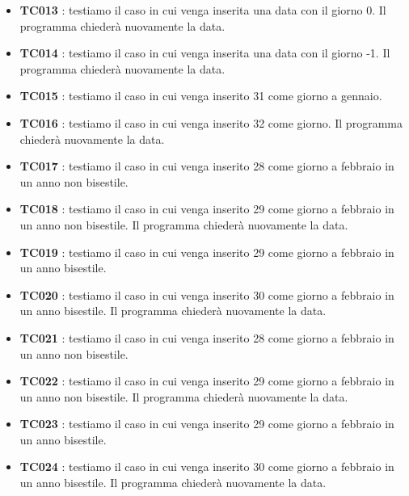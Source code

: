 \documentclass[11pt]{scrartcl} %
\begin{document}
\begin{itemize}


	\item \textbf{TC013} : testiamo il caso in cui venga inserita una data con il giorno 0. Il programma chiederà nuovamente la data.

	\item \textbf{TC014} : testiamo il caso in cui venga inserita una data con il giorno -1. Il programma chiederà nuovamente la data.

	\item \textbf{TC015} : testiamo il caso in cui venga inserito 31 come giorno a gennaio.

	\item \textbf{TC016} : testiamo il caso  in cui venga inserito 32 come giorno. Il programma chiederà nuovamente la data.

	\item \textbf{TC017} : testiamo il caso  in cui venga inserito 28 come giorno a febbraio in un anno non bisestile.

	\item \textbf{TC018} : testiamo il caso  in cui venga inserito 29 come giorno a febbraio in un anno non bisestile. Il programma chiederà nuovamente la data.

	\item \textbf{TC019} : testiamo il caso in cui venga inserito 29 come giorno a febbraio in un anno bisestile.

	\item \textbf{TC020} : testiamo il caso in cui venga inserito 30 come giorno a febbraio in un anno bisestile. Il programma chiederà nuovamente la data.

	\item \textbf{TC021} : testiamo il caso in cui venga inserito 28 come giorno a febbraio in un anno non bisestile.

	\item \textbf{TC022} : testiamo il caso in cui venga inserito 29 come giorno a febbraio in un anno non bisestile. Il programma chiederà nuovamente la data.

	\item \textbf{TC023} : testiamo il caso in cui venga inserito 29 come giorno a febbraio in un anno  bisestile.

	\item \textbf{TC024} : testiamo il caso  in cui venga inserito 30 come giorno a febbraio in un anno bisestile. Il programma chiederà nuovamente la data.


\end{itemize}
\end{document}
